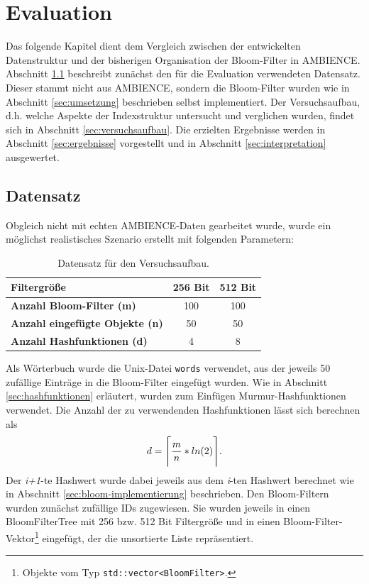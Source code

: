 \chapter{Evaluation}\label{ch:evaluation}
Das folgende Kapitel dient dem Vergleich zwischen der entwickelten Datenstruktur und der bisherigen Organisation der Bloom-Filter in AMBIENCE. Abschnitt \ref{sec:datensatz} beschreibt zunächst den für die Evaluation verwendeten Datensatz. Dieser stammt nicht aus AMBIENCE, sondern die Bloom-Filter wurden wie in Abschnitt \ref{sec:umsetzung} beschrieben selbst implementiert. Der Versuchsaufbau, d.h. welche Aspekte der Indexstruktur untersucht und verglichen wurden, findet sich in Abschnitt \ref{sec:versuchsaufbau}. Die erzielten Ergebnisse werden in Abschnitt \ref{sec:ergebnisse} vorgestellt und in Abschnitt \ref{sec:interpretation} ausgewertet. 
\section{Datensatz}\label{sec:datensatz}
Obgleich nicht mit echten AMBIENCE-Daten gearbeitet wurde, wurde ein möglichst realistisches Szenario erstellt mit folgenden Parametern:
\begin{center}
\begin{table}[htbp]
{\small
\begin{center}
\begin{tabular}[center]{lcc}
\toprule
\textbf{Filtergröße} & 256 Bit & 512 Bit\\
\midrule
\textbf{Anzahl Bloom-Filter (m)} & 100 & 100\\
\midrule
\textbf{Anzahl eingefügte Objekte (n)} & 50 & 50\\
\midrule
\textbf{Anzahl Hashfunktionen (d)} & 4 & 8\\
\bottomrule
\end{tabular}
\end{center}
} %
\caption[Datensatz für den Versuchsaufbau]{Datensatz für den Versuchsaufbau.\label{tab:Datensatz}}
\end{table}
\end{center}
Als Wörterbuch wurde die Unix-Datei \texttt{words} verwendet, aus der jeweils 50 zufällige Einträge in die Bloom-Filter eingefügt wurden. Wie in Abschnitt \ref{sec:hashfunktionen} erläutert, wurden zum Einfügen Murmur-Hashfunktionen verwendet. Die Anzahl der zu verwendenden Hashfunktionen lässt sich berechnen als 
\[d = \Ceil[\Bigg]{\frac{m}{n} * ln(2)}.\]
\noindent
Der \textit{i+1}-te Hashwert wurde dabei jeweils aus dem \textit{i}-ten Hashwert berechnet wie in Abschnitt \ref{sec:bloom-implementierung} beschrieben. Den Bloom-Filtern wurden zunächst zufällige IDs zugewiesen. Sie wurden jeweils in einen BloomFilterTree mit 256 bzw. 512 Bit Filtergröße und in einen Bloom-Filter-Vektor\footnote{Objekte vom Typ \texttt{std::vector<BloomFilter>}.} eingefügt, der die unsortierte Liste repräsentiert.
\newpage

